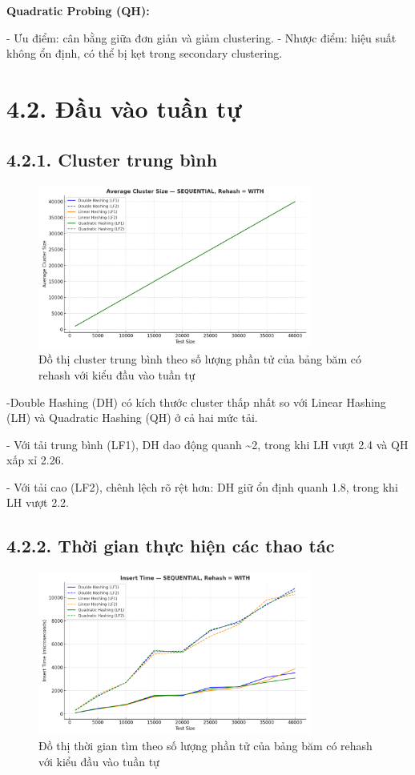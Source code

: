 \documentclass[12pt,a4paper]{report}
\begin{document}
	\textbf{Quadratic Probing (QH):}
    
-	Ưu điểm: cân bằng giữa đơn giản và giảm clustering.
-	Nhược điểm: hiệu suất không ổn định, có thể bị kẹt trong secondary clustering.


\section*{4.2. Đầu vào tuần tự}
\subsection*{4.2.1. Cluster trung bình}
\begin{figure}[!ht]
    \centering
    \includegraphics[width=0.8\textwidth]{seq_clus_hash.png}
    \caption{Đồ thị cluster trung bình theo số lượng phần tử của bảng băm có rehash với kiểu đầu vào tuần tự}
    \label{fig:flowchart}
\end{figure}
\noindent \indent -Double Hashing (DH) có kích thước cluster thấp nhất so với Linear Hashing (LH) và Quadratic Hashing (QH) ở cả hai mức tải.

-	Với tải trung bình (LF1), DH dao động quanh \textasciitilde 2, trong khi LH vượt 2.4 và QH xấp xỉ 2.26.

-	Với tải cao (LF2), chênh lệch rõ rệt hơn: DH giữ ổn định quanh 1.8, trong khi LH vượt 2.2.

\subsection*{4.2.2. Thời gian thực hiện các thao tác}
\begin{figure}[!ht]
    \centering
    \includegraphics[width=0.8\textwidth]{seq_ins_hash.png}
    \caption{Đồ thị thời gian tìm theo số lượng phần tử của bảng băm có rehash với kiểu đầu vào tuần tự}
    \label{fig:flowchart}
\end{figure}
\end{document}
